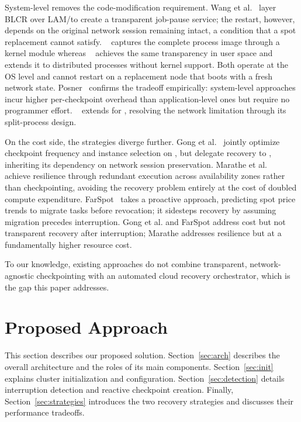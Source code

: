 \documentclass[conference]{IEEEtran}
\begin{document}
System-level \CR removes the code-modification requirement.
Wang et al.~\cite{wang2007partial} layer BLCR over LAM/\MPI to create a transparent
job-pause service; the restart, however, depends on the original network session
remaining intact, a condition that a spot replacement cannot satisfy.
\BLCR~\cite{hargrove2006blcr} captures the complete process image through a kernel
module whereas \DMTCP~\cite{ansel2009dmtcp} achieves the same transparency in user space and
extends it to distributed processes without kernel support.
Both operate at the OS level and cannot restart on a replacement node that boots with a
fresh network state.
Posner~\cite{posner2020syslevel} confirms the tradeoff empirically: system-level
approaches incur higher per-checkpoint overhead than application-level ones but require
no programmer effort.
\MANA~\cite{garg2019mana,xu2023mana} extends \DMTCP for \MPI, resolving the network
limitation through its split-process design.

On the cost side, the strategies diverge further.
Gong et al.~\cite{gong2015cost} jointly optimize checkpoint frequency and instance
selection on \ECC, but delegate recovery to \BLCR, inheriting its dependency on network
session preservation.
Marathe et al.~\cite{marathe2014hpdc} achieve resilience through redundant execution
across availability zones rather than checkpointing, avoiding the recovery problem
entirely at the cost of doubled compute expenditure.
FarSpot~\cite{zhou2022farspot} takes a proactive approach, predicting spot price trends
to migrate tasks before revocation; it sidesteps recovery by assuming migration
precedes interruption.
Gong et al. and FarSpot address cost but not transparent recovery after interruption;
Marathe addresses resilience but at a fundamentally higher resource cost.

To our knowledge, existing approaches do not combine transparent, network-agnostic \MPI
checkpointing with an automated cloud recovery orchestrator, which is the gap this paper
addresses.


\section{Proposed Approach}
\label{sec:approach}

This section describes our proposed solution. Section~\ref{sec:arch} describes the overall architecture and the roles of its main components. Section~\ref{sec:init} explains cluster initialization and configuration. Section~\ref{sec:detection} details interruption detection and reactive checkpoint creation. Finally, Section~\ref{sec:strategies} introduces the two recovery strategies and discusses their performance tradeoffs.
\end{document}
